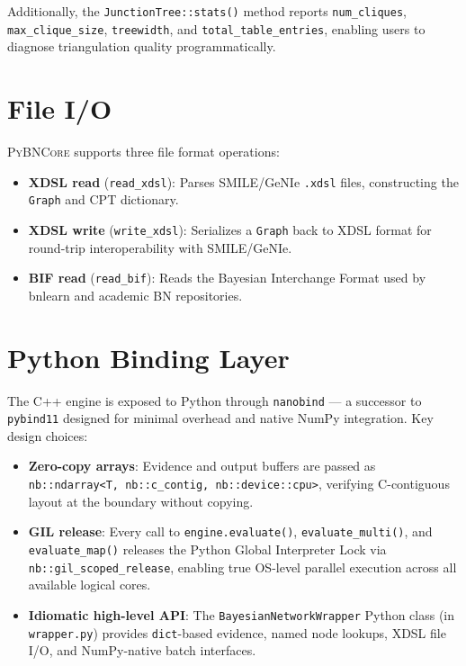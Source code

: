 \documentclass[11pt, letterpaper]{article}
\newcommand{\bncore}{\textsc{PyBNCore}}
\theoremstyle{definitionstyle}
\begin{document}
Additionally, the \texttt{JunctionTree::stats()} method reports
\texttt{num\_cliques}, \texttt{max\_clique\_size}, \texttt{treewidth}, and
\texttt{total\_table\_entries}, enabling users to diagnose triangulation
quality programmatically.


\section{File I/O}
\label{sec:io}

\bncore{} supports three file format operations:

\begin{itemize}[nosep]
  \item \textbf{XDSL read} (\texttt{read\_xdsl}): Parses SMILE/GeNIe
    \texttt{.xdsl} files, constructing the \texttt{Graph} and CPT dictionary.
  \item \textbf{XDSL write} (\texttt{write\_xdsl}): Serializes a \texttt{Graph}
    back to XDSL format for round-trip interoperability with SMILE/GeNIe.
  \item \textbf{BIF read} (\texttt{read\_bif}): Reads the Bayesian Interchange
    Format used by bnlearn and academic BN repositories.
\end{itemize}


\section{Python Binding Layer}
\label{sec:python}

The C++ engine is exposed to Python through \texttt{nanobind} — a
successor to \texttt{pybind11} designed for minimal overhead and
native NumPy integration. Key design choices:

\begin{itemize}[itemsep=3pt]
  \item \textbf{Zero-copy arrays}: Evidence and output buffers are passed
        as \texttt{nb::ndarray<T, nb::c\_contig, nb::device::cpu>},
        verifying C-contiguous layout at the boundary without copying.
  \item \textbf{GIL release}: Every call to \texttt{engine.evaluate()},
        \texttt{evaluate\_multi()}, and \texttt{evaluate\_map()} releases
        the Python Global Interpreter Lock via
        \texttt{nb::gil\_scoped\_release}, enabling true OS-level
        parallel execution across all available logical cores.
  \item \textbf{Idiomatic high-level API}: The \texttt{BayesianNetworkWrapper}
        Python class (in \texttt{wrapper.py}) provides \texttt{dict}-based
        evidence, named node lookups, XDSL file I/O, and NumPy-native
        batch interfaces.
\end{itemize}
\end{document}
